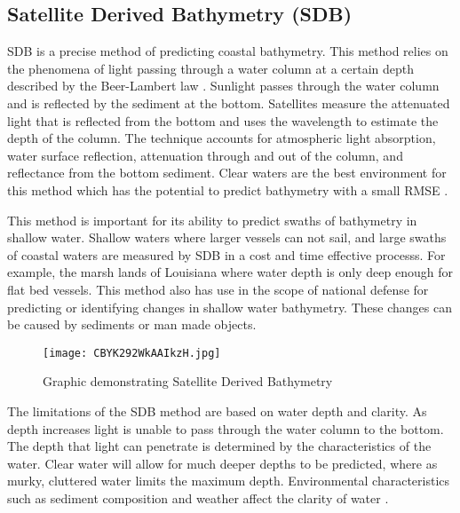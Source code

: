 \subsection{Satellite Derived Bathymetry (SDB)}
\ac{SDB} is a precise method of predicting coastal bathymetry. 
This method relies on the phenomena of light passing through a water column at a certain depth described by the Beer-Lambert law \cite{chybicki2018three}\cite{vinayaraj2016satellite}.
Sunlight passes through the water column and is reflected by the sediment at the bottom.
Satellites measure the attenuated light that is reflected from the bottom and uses the wavelength to estimate the depth of the column.
The technique accounts for atmospheric light absorption, water surface reflection, attenuation through and out of the column, and reflectance from the bottom sediment.
Clear waters are the best environment for this method which has the potential to predict bathymetry with a small RMSE \cite{chybicki2018three}.

\par
This method is important for its ability to predict swaths of bathymetry in shallow water.
Shallow waters where larger vessels can not sail, and large swaths of coastal waters are measured by \ac{SDB} in a cost and time effective processs.
For example, the marsh lands of Louisiana where water depth is only deep enough for flat bed vessels.
This method also has use in the scope of national defense for predicting or identifying changes in shallow water bathymetry.
These changes can be caused by sediments or man made objects. 

\begin{figure}[h]
    \centering
    \texttt{[image: CBYK292WkAAIkzH.jpg]}
    \caption{Graphic demonstrating Satellite Derived Bathymetry}
    \label{fig:sdb}
\end{figure}

\par
The limitations of the \ac{SDB} method are based on water depth and clarity.
As depth increases light is unable to pass through the water column to the bottom.
The depth that light can penetrate is determined by the characteristics of the water.
Clear water will allow for much deeper depths to be predicted, where as murky, cluttered water limits the maximum depth.
Environmental characteristics such as sediment composition and weather affect the clarity of water \cite{vinayaraj2016satellite}.

